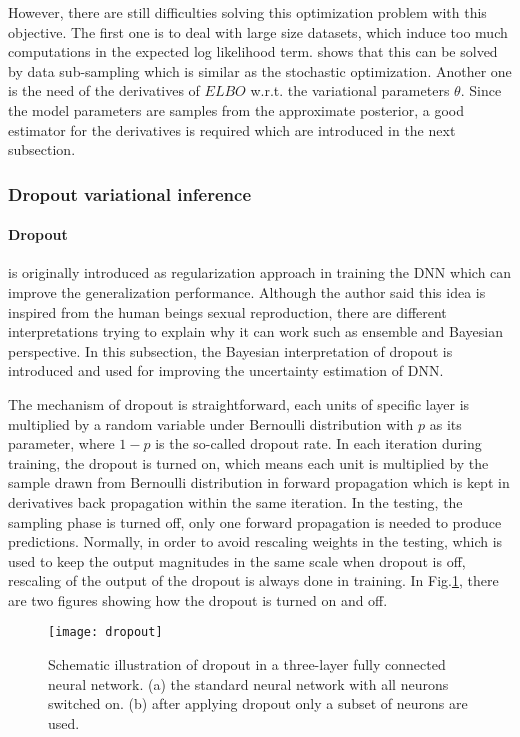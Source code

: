 However, there are still difficulties solving this optimization problem with this objective. The first one is to deal with large size datasets, which induce too much computations in the expected log likelihood term. \cite{graves2011practical} shows
that this can be solved by data sub-sampling which is similar as the stochastic optimization. Another one is the need of the derivatives of $ELBO$ w.r.t. the variational parameters $\theta$. Since the model parameters are samples from the approximate posterior, a good estimator for the derivatives is required which are introduced in the next subsection. 

\subsubsection{Dropout variational inference}

\paragraph{Dropout\cite{srivastava2014dropout}} is originally introduced as regularization approach in training the DNN which can improve the generalization performance. Although the author said this idea is inspired from the human beings sexual reproduction, there are different interpretations trying to explain why it can work such as ensemble and Bayesian perspective. In this subsection, the Bayesian interpretation of dropout is introduced and used for improving the uncertainty estimation of DNN. 

The mechanism of dropout is straightforward, each units of specific layer is multiplied by a random variable under Bernoulli distribution with $p$ as its parameter, where $1 - p$ is the so-called dropout rate. In each iteration during training, the dropout is turned on, which means each unit is multiplied by the sample drawn from Bernoulli distribution in forward propagation which is kept in derivatives back propagation within the same iteration. In the testing, the sampling phase is turned off, only one forward propagation is needed to produce predictions. Normally, in order to avoid rescaling weights in the testing, which is used to keep the output magnitudes in the same scale when dropout is off, rescaling of the output of the dropout is always done in training. In Fig.\ref{fig:dropout}, there are two figures showing how the dropout is turned on and off. 

\begin{figure}[H]
	\begin{center}
		\texttt{[image: dropout]}
		\caption{Schematic illustration of dropout in a three-layer fully connected neural network. (a) the standard neural network with all neurons switched on. (b) after applying dropout only a subset of neurons are used\cite{srivastava2014dropout}.}		
		\label{fig:dropout}
	\end{center}
\end{figure}


